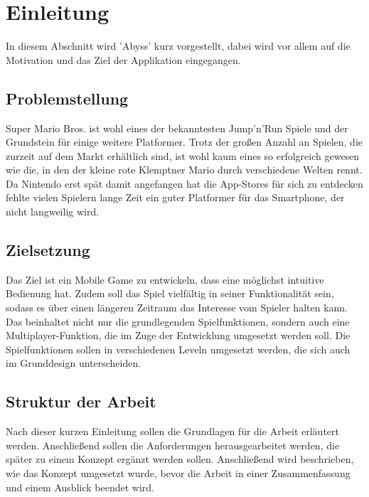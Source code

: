 \chapter{Einleitung}
\label{cha:einleitung}
In diesem Abschnitt wird 'Abyss' kurz vorgestellt, dabei wird vor allem auf 
die Motivation und das Ziel der Applikation eingegangen.

\section{Problemstellung}
\label{sec:einleitung:problemstellung}
Super Mario Bros. \cite{mario} ist wohl eines der bekanntesten Jump'n'Run Spiele und
der Grundstein für einige weitere Platformer. Trotz der großen Anzahl an Spielen,
die zurzeit auf dem Markt erhältlich sind, ist wohl kaum eines so erfolgreich gewesen
wie die, in den der kleine rote Klemptner Mario durch verschiedene Welten rennt. \newline
Da Nintendo erst spät damit angefangen hat die App-Stores für sich zu entdecken 
fehlte vielen Spielern lange Zeit ein guter Platformer für das Smartphone, 
der nicht langweilig wird.


\section{Zielsetzung}
\label{sec:einleitung:zielsetzung}
Das Ziel ist ein Mobile Game zu entwickeln, dass eine möglichst intuitive Bedienung
hat. Zudem soll das Spiel vielfältig in seiner Funktionalität sein, sodass es 
über einen längeren Zeitraum das Interesse vom Spieler halten kann. \newline
Das beinhaltet nicht nur die grundlegenden Spielfunktionen, sondern auch eine 
Multiplayer-Funktion, die im Zuge der Entwicklung umgesetzt werden soll. 
Die Spielfunktionen sollen in verschiedenen Leveln umgesetzt werden, die sich 
auch im Grunddesign unterscheiden.

\section{Struktur der Arbeit}
\label{sec:einleitung:struktur}
Nach dieser kurzen Einleitung sollen die Grundlagen für die Arbeit erläutert werden.
Anschließend sollen die Anforderungen herausgearbeitet werden, die später zu einem Konzept 
ergänzt werden sollen. Anschließend wird beschrieben, wie das Konzept umgesetzt wurde, bevor
die Arbeit in einer Zusammenfassung und einem Ausblick beendet wird.